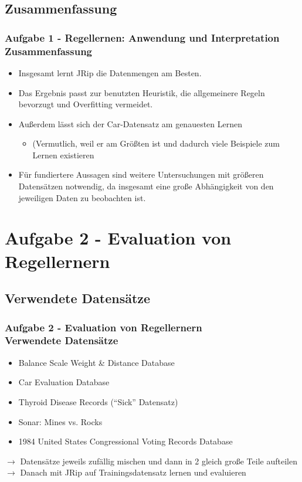 \documentclass[accentcolor=tud6b,colorbacktitle,inverttitle,landscape,german,presentation,t]{tudbeamer}
\begin{document}
    \subsection{Zusammenfassung}    
    \begin{frame}[t]
    \frametitle{Aufgabe 1 - Regellernen: Anwendung und Interpretation\\ Zusammenfassung}
        \begin{itemize}
            \item Insgesamt lernt JRip die Datenmengen am Besten.
            \item Das Ergebnis passt zur benutzten Heuristik, die allgemeinere Regeln bevorzugt und Overfitting vermeidet.
            \item Außerdem lässt sich der Car-Datensatz am genauesten Lernen 
            \begin{itemize}
                \item (Vermutlich, weil er am Größten ist und dadurch viele Beispiele zum Lernen existieren
            \end{itemize}
            \item Für fundiertere Aussagen sind weitere Untersuchungen mit größeren Datensätzen notwendig, da insgesamt eine große Abhängigkeit von den jeweiligen Daten zu beobachten ist.
        \end{itemize}
    \end{frame}
    
    \section{Aufgabe 2 - Evaluation von Regellernern}
    
    \subsection{Verwendete Datensätze}
    
    \begin{frame}[t]
    \frametitle{Aufgabe 2 - Evaluation von Regellernern\\ Verwendete Datensätze}
        \begin{itemize}
            \item Balance Scale Weight \& Distance Database
            \item Car Evaluation Database
            \item Thyroid Disease Records (``Sick'' Datensatz)
            \item Sonar: Mines vs. Rocks
            \item 1984 United States Congressional Voting Records Database
        \end{itemize}
        \vfill
        $\rightarrow$ Datensätze jeweils zufällig mischen und dann in 2 gleich große Teile aufteilen\\
        $\rightarrow$ Danach mit JRip auf Trainingsdatensatz lernen und evaluieren
    \end{frame}
    
\end{document}
